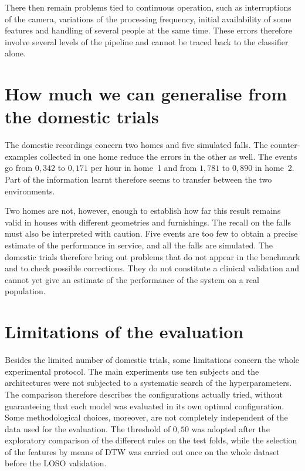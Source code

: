There then remain problems tied to continuous operation, such as interruptions of the camera, variations of the processing frequency, initial availability of some features and handling of several people at the same time. These errors therefore involve several levels of the pipeline and cannot be traced back to the classifier alone.

\section{How much we can generalise from the domestic trials}

The domestic recordings concern two homes and five simulated falls.
The counter-examples collected in one home reduce the errors in the other as well. The events go from $0{,}342$ to $0{,}171$ per hour in home~1 and from $1{,}781$ to $0{,}890$ in home~2. Part of the information learnt therefore seems to transfer between the two environments.

Two homes are not, however, enough to establish how far this result remains valid in houses with different geometries and furnishings. The recall on the falls must also be interpreted with caution. Five events are too few to obtain a precise estimate of the performance in service, and all the falls are simulated. The domestic trials therefore bring out problems that do not appear in the benchmark and to check possible corrections. They do not constitute a clinical validation and cannot yet give an estimate of the performance of the system on a real population.

\section{Limitations of the evaluation}

Besides the limited number of domestic trials, some limitations concern the whole experimental protocol. The main experiments use ten subjects and the architectures were not subjected to a systematic search of the hyperparameters. The comparison therefore describes the configurations actually tried, without guaranteeing that each model was evaluated in its own optimal configuration. Some methodological choices, moreover, are not completely independent of the data used for the evaluation. The threshold of $0{,}50$ was adopted after the exploratory comparison of the different rules on the test folds, while the selection of the features by means of DTW was carried out once on the whole dataset before the LOSO validation.

